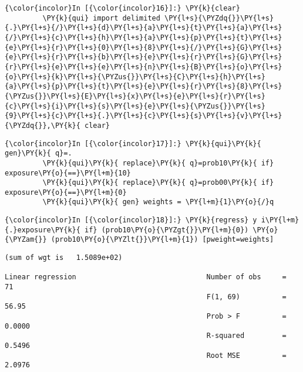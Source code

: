\documentclass[11pt,notitlepage]{article}\usepackage[]{graphicx}\usepackage[]{color}
\makeatletter
\newenvironment{kframe}{%
 \def\at@end@of@kframe{}%
 \ifinner\ifhmode%
  \def\at@end@of@kframe{\end{minipage}}%
  \begin{minipage}{\columnwidth}%
 \fi\fi%
 \def\FrameCommand##1{\hskip\@totalleftmargin \hskip-\fboxsep
 \colorbox{shadecolor}{##1}\hskip-\fboxsep
     \hskip-\linewidth \hskip-\@totalleftmargin \hskip\columnwidth}%
 \MakeFramed {\advance\hsize-\width
   \@totalleftmargin\z@ \linewidth\hsize
   \@setminipage}}%
 {\par\unskip\endMakeFramed%
 \at@end@of@kframe}
\newenvironment{knitrout}{}{} %
\makeatother
\begin{document}
\begin{enumerate}[a)]
\begin{knitrout}
\color{fgcolor}\begin{kframe}
   \begin{Verbatim}[commandchars=\\\{\}]
{\color{incolor}In [{\color{incolor}16}]:} \PY{k}{clear}
         \PY{k}{qui} import delimited \PY{l+s}{\PYZdq{}}\PY{l+s}{.}\PY{l+s}{/}\PY{l+s}{d}\PY{l+s}{a}\PY{l+s}{t}\PY{l+s}{a}\PY{l+s}{/}\PY{l+s}{c}\PY{l+s}{h}\PY{l+s}{a}\PY{l+s}{p}\PY{l+s}{t}\PY{l+s}{e}\PY{l+s}{r}\PY{l+s}{0}\PY{l+s}{8}\PY{l+s}{/}\PY{l+s}{G}\PY{l+s}{e}\PY{l+s}{r}\PY{l+s}{b}\PY{l+s}{e}\PY{l+s}{r}\PY{l+s}{G}\PY{l+s}{r}\PY{l+s}{e}\PY{l+s}{e}\PY{l+s}{n}\PY{l+s}{B}\PY{l+s}{o}\PY{l+s}{o}\PY{l+s}{k}\PY{l+s}{\PYZus{}}\PY{l+s}{C}\PY{l+s}{h}\PY{l+s}{a}\PY{l+s}{p}\PY{l+s}{t}\PY{l+s}{e}\PY{l+s}{r}\PY{l+s}{8}\PY{l+s}{\PYZus{}}\PY{l+s}{E}\PY{l+s}{x}\PY{l+s}{e}\PY{l+s}{r}\PY{l+s}{c}\PY{l+s}{i}\PY{l+s}{s}\PY{l+s}{e}\PY{l+s}{\PYZus{}}\PY{l+s}{9}\PY{l+s}{c}\PY{l+s}{.}\PY{l+s}{c}\PY{l+s}{s}\PY{l+s}{v}\PY{l+s}{\PYZdq{}},\PY{k}{ clear}
\end{Verbatim}

    \begin{Verbatim}[commandchars=\\\{\}]
{\color{incolor}In [{\color{incolor}17}]:} \PY{k}{qui}\PY{k}{ gen}\PY{k}{ q}=.
         \PY{k}{qui}\PY{k}{ replace}\PY{k}{ q}=prob10\PY{k}{ if} exposure\PY{o}{==}\PY{l+m}{10}
         \PY{k}{qui}\PY{k}{ replace}\PY{k}{ q}=prob00\PY{k}{ if} exposure\PY{o}{==}\PY{l+m}{0}
         \PY{k}{qui}\PY{k}{ gen} weights = \PY{l+m}{1}\PY{o}{/}q
\end{Verbatim}

    \begin{Verbatim}[commandchars=\\\{\}]
{\color{incolor}In [{\color{incolor}18}]:} \PY{k}{regress} y i\PY{l+m}{.}exposure\PY{k}{ if} (prob10\PY{o}{\PYZgt{}}\PY{l+m}{0}) \PY{o}{\PYZam{}} (prob10\PY{o}{\PYZlt{}}\PY{l+m}{1}) [pweight=weights]
\end{Verbatim}

    \begin{Verbatim}[commandchars=\\\{\}]
(sum of wgt is   1.5089e+02)

Linear regression                               Number of obs     =         71
                                                F(1, 69)          =      56.95
                                                Prob > F          =     0.0000
                                                R-squared         =     0.5496
                                                Root MSE          =     2.0976


\end{Verbatim}
\end{kframe}
\end{knitrout}
\end{enumerate}
\end{document}
